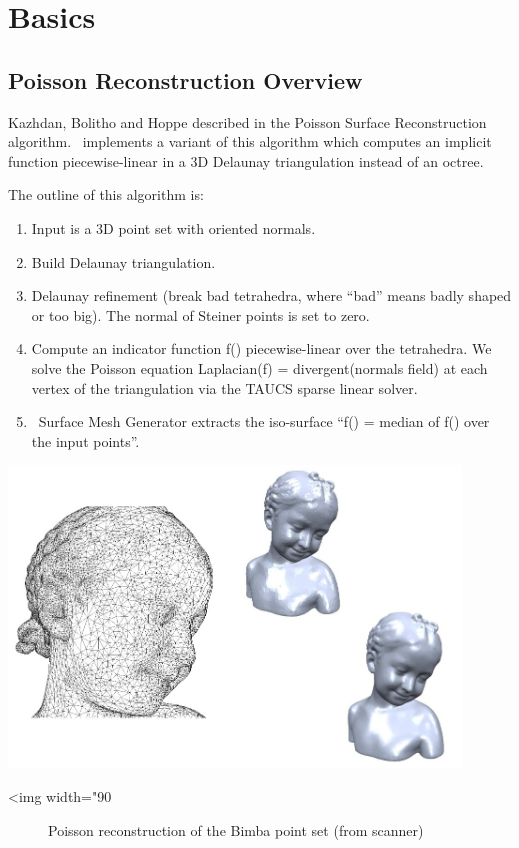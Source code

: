 \section{Basics}


\subsection{Poisson Reconstruction Overview}

Kazhdan, Bolitho and Hoppe described in \cite{Kazhdan06}
the Poisson Surface Reconstruction algorithm.
\cgal\ implements a variant of this algorithm which computes an implicit function
piecewise-linear in a 3D Delaunay triangulation instead of an octree.

The outline of this algorithm is:

\begin{enumerate}
\item Input is a 3D point set with oriented normals.
\item Build Delaunay triangulation.
\item Delaunay refinement (break bad tetrahedra, where {}``bad'' means
badly shaped or too big). The normal of Steiner points is set to zero.
\item Compute an indicator function f() piecewise-linear over the tetrahedra.
We solve the Poisson equation Laplacian(f) = divergent(normals field)
at each vertex of the triangulation via the TAUCS sparse linear solver.
\item \cgal\ Surface Mesh Generator extracts the iso-surface {}``f() = median
of f() over the input points''.
\end{enumerate}

\begin{center}
    \label{Surface_reconstruction_3-fig-poisson}
    \begin{ccTexOnly}
        \includegraphics[width=0.9\textwidth]{Surface_reconstruction_3/poisson} %
    \end{ccTexOnly}
    \begin{ccHtmlOnly}
        <img width="90%
    \end{ccHtmlOnly}
    \begin{figure}[h]
        \caption{Poisson reconstruction of the Bimba point set (from scanner)}
    \end{figure}
\end{center}


